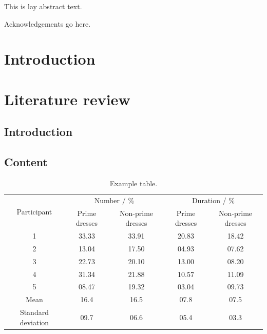 \documentclass[times,thesis]{uom_thesis_casson} %
\begin{document}
\begin{uomlay} %
  This is lay abstract text. 
  
  \lipsum[1-2]
\end{uomlay}



\uomdeclarations %



\begin{uomacknowledgements} %
Acknowledgements go here.
\end{uomacknowledgements}



\chapter{Introduction} %
  \lipsum[1-5] %

\chapter{Literature review}

  \section{Introduction}
  \lipsum[1] 
  
  \section{Content}
  \lipsum[1-2] \cite{ref:jCAS09,ref:jCAS09a,ref:jCAS10} \lipsum[3-5]
  \begin{table}
    \centering
    \caption{Example table.}
    \label{table:example_table}
    \begin{tabular}{ccccc}
      \toprule
      \multirow{2}{*}{Participant} & \multicolumn{2}{c}{Number / \%} & \multicolumn{2}{c}{Duration / \%} \\
                                   & Prime dresses & Non-prime dresses & Prime dresses & Non-prime dresses \\
	  \toprule
      1  & 33.33 & 33.91 & 20.83 & 18.42 \\
      2  & 13.04 & 17.50 & 04.93 & 07.62 \\
      3  & 22.73 & 20.10 & 13.00 & 08.20 \\
      4  & 31.34 & 21.88 & 10.57 & 11.09 \\
      5  & 08.47 & 19.32 & 03.04 & 09.73 \\
      \hline
      Mean & 16.4 & 16.5 & 07.8 & 07.5 \\
      Standard deviation & 09.7 & 06.6 & 05.4 & 03.3 \\
      \bottomrule
    \end{tabular}
  \end{table}  
  
\end{document}
